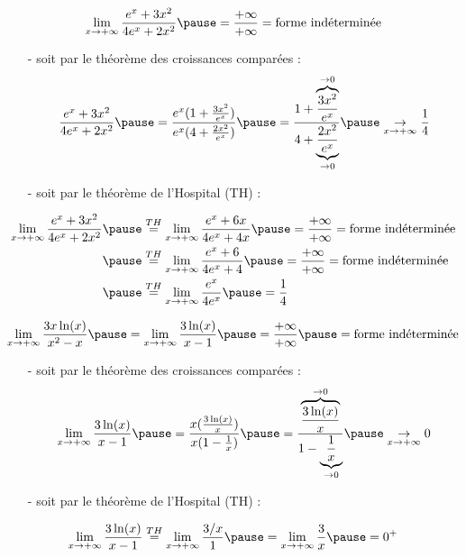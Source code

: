 \documentclass[9pt,handout,professionalfonts,hyperref]{beamer}
\begin{document}
\begin{frame}
$$\lim_{x \to +\infty} \dfrac{e^x+3x^2}{4e^x+2x^2}\pause =\dfrac{+\infty}{+\infty}= \text{forme indéterminée}$$
\pause
\medskip
\begin{itemize}
	\item[-] soit par le théorème des croissances comparées : $$\dfrac{e^x+3x^2}{4e^x+2x^2} \pause= \dfrac{e^x(1+\frac{3x^2}{e^x})}{e^x(4+\frac{2x^2}{e^x})} \pause= \dfrac{1+\overbrace{\frac{3x^2}{e^x}}^{\to 0}}{4+\underbrace{\frac{2x^2}{e^x}}_{\to 0}} \pause \underset{x \to +\infty}{\to} \frac{1}{4} $$ \newline

 \pause	\item[-] soit par le théorème de l'Hospital (TH) :
\end{itemize}

\[\begin{aligned}
\lim_{x \to +\infty} \dfrac{e^x+3x^2}{4e^x+2x^2}
\pause &\overset{TH}{=}\lim_{x \to +\infty} \dfrac{e^x+6x}{4e^x+4x}\pause =\dfrac{+\infty}{+\infty}= \text{forme indéterminée}\\
\pause &\overset{TH}{=}\lim_{x \to +\infty} \dfrac{e^x+6}{4e^x+4}\pause =\dfrac{+\infty}{+\infty}= \text{forme indéterminée}\\
\pause &\overset{TH}{=}\lim_{x \to +\infty} \dfrac{e^x}{4e^x} \pause = \dfrac{1}{4}
\end{aligned}\]
\end{frame}

\begin{frame}
\[\begin{aligned}
\lim_{x \to +\infty} \dfrac{3 x \ln(x)}{x^2-x}\pause =\lim_{x \to +\infty} \dfrac{3 \ln(x)}{x-1}\pause =\dfrac{+\infty}{+\infty} \pause = \text{forme indéterminée}
\end{aligned}\]

\pause
\medskip
\begin{itemize}
	\item[-] soit par le théorème des croissances comparées : $$\lim_{x \to +\infty} \dfrac{3 \ln(x)}{x-1} \pause= \dfrac{x(\frac{3 \ln(x)}{x})}{x(1-\frac{1}{x})} \pause= \dfrac{\overbrace{\frac{3\ln(x)}{x}}^{\to 0}}{1-\underbrace{\frac{1}{x}}_{\to 0}} \pause \underset{x \to +\infty}{\to} 0 $$ \newline

	\pause	\item[-] soit par le théorème de l'Hospital (TH) :
\end{itemize}

\[\begin{aligned}
\lim_{x \to +\infty} \dfrac{3 \ln(x)}{x-1} \overset{TH}{=} \lim_{x \to +\infty} \dfrac{3/x}{1}\pause =\lim_{x \to +\infty} \dfrac{3}{x}\pause  = 0^+
\end{aligned}\]

\end{frame}
\end{document}
